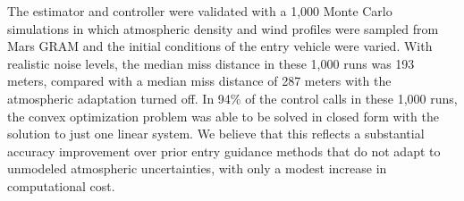 The estimator and controller were validated with a 1,000 Monte Carlo simulations in which atmospheric density and wind profiles were sampled from Mars GRAM and the initial conditions of the entry vehicle were varied. With realistic noise levels, the median miss distance in these 1,000 runs was 193 meters, compared with a median miss distance of 287 meters with the atmospheric adaptation turned off. In 94\% of the control calls in these 1,000 runs, the convex optimization problem was able to be solved in closed form with the solution to just one linear system. We believe that this reflects a substantial accuracy improvement over prior entry guidance methods that do not adapt to unmodeled atmospheric uncertainties, with only a modest increase in computational cost.
